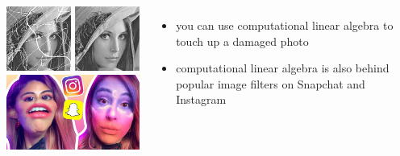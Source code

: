 \documentclass[handout]{beamer}
\begin{document}
\begin{frame}{}
 \begin{columns}
    \centering
             \includegraphics[width=\linewidth]{img/image-processing.jpg}
	     \\\vspace{.3in}
             \includegraphics[width=\linewidth]{img/filters.jpg}
    \begin{itemize}
      \item you can use computational linear algebra to touch up a damaged photo
      \item computational linear algebra is also behind popular image filters on Snapchat and Instagram
    \end{itemize}
 \end{columns} 
\end{frame}
\end{document}
